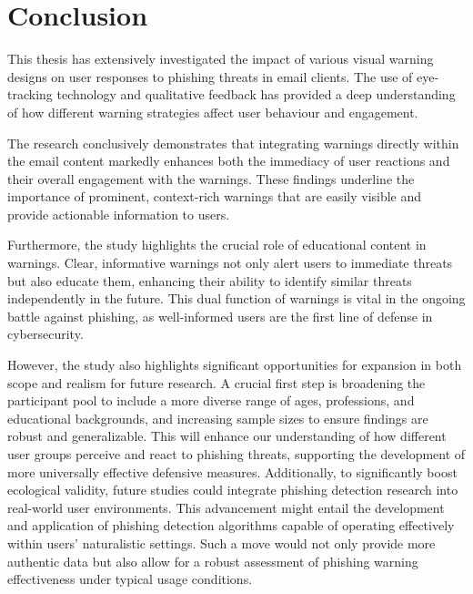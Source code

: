 \documentclass[
  a4paper,  %
  twoside,  %
  bibliography=totoc,
  headsepline,
  cleardoublepage=empty,
  parskip=half,
  draft=false
]{scrbook}
\begin{document}
\chapter{Conclusion}
\label{sec:conclusion}
This thesis has extensively investigated the impact of various visual warning designs on user responses to phishing threats in email clients. The use of eye-tracking technology and qualitative feedback has provided a deep understanding of how different warning strategies affect user behaviour and engagement.

The research conclusively demonstrates that integrating warnings directly within the email content markedly enhances both the immediacy of user reactions and their overall engagement with the warnings. These findings underline the importance of prominent, context-rich warnings that are easily visible and provide actionable information to users.

Furthermore, the study highlights the crucial role of educational content in warnings. Clear, informative warnings not only alert users to immediate threats but also educate them, enhancing their ability to identify similar threats independently in the future. This dual function of warnings is vital in the ongoing battle against phishing, as well-informed users are the first line of defense in cybersecurity.

However, the study also highlights significant opportunities for expansion in both scope and realism for future research. A crucial first step is broadening the participant pool to include a more diverse range of ages, professions, and educational backgrounds, and increasing sample sizes to ensure findings are robust and generalizable. This will enhance our understanding of how different user groups perceive and react to phishing threats, supporting the development of more universally effective defensive measures. Additionally, to significantly boost ecological validity, future studies could integrate phishing detection research into real-world user environments. This advancement might entail the development and application of phishing detection algorithms capable of operating effectively within users' naturalistic settings. Such a move would not only provide more authentic data but also allow for a robust assessment of phishing warning effectiveness under typical usage conditions.
\end{document}

